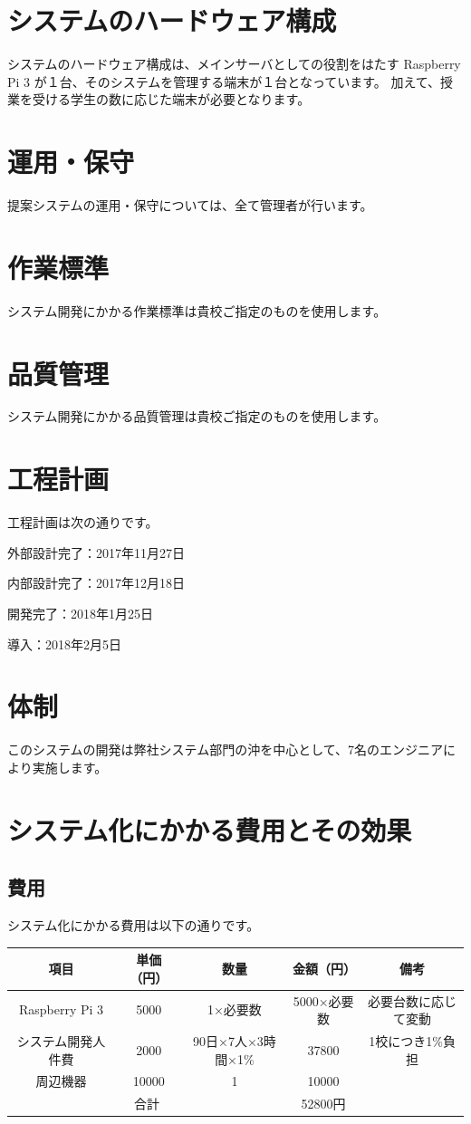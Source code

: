 \documentclass[a4j,titlepage]{ujarticle}
\begin{document}
\section{システムのハードウェア構成}
システムのハードウェア構成は、メインサーバとしての役割をはたす Raspberry Pi 3 が１台、そのシステムを管理する端末が１台となっています。
加えて、授業を受ける学生の数に応じた端末が必要となります。

\section{運用・保守}
提案システムの運用・保守については、全て管理者が行います。

\section{作業標準}
システム開発にかかる作業標準は貴校ご指定のものを使用します。

\section{品質管理}
システム開発にかかる品質管理は貴校ご指定のものを使用します。

\section{工程計画}
工程計画は次の通りです。

外部設計完了：2017年11月27日

内部設計完了：2017年12月18日

開発完了：2018年1月25日

導入：2018年2月5日

\section{体制}
このシステムの開発は弊社システム部門の沖を中心として、7名のエンジニアにより実施します。

\section{システム化にかかる費用とその効果}
\subsection{費用}
システム化にかかる費用は以下の通りです。

\begin{table}[htb]
  \begin{tabular}{|c|c|c|c|c|} \hline
    項目 & 単価（円） & 数量 & 金額（円） & 備考 \\ \hline
     Raspberry Pi 3 &  5000&  1×必要数&  5000×必要数& 必要台数に応じて変動 \\ \hline
     システム開発人件費&  2000& 90日×7人×3時間×1\%&37800&1校につき1\%負担  \\ \hline
     周辺機器&  10000&  1&  10000&  \\ \hline
    \multicolumn{3}{|c|}{合計}& 52800円 &  \\ \hline
  \end{tabular}
\end{table}
\end{document}
